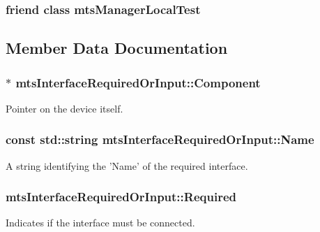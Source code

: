 \hypertarget{classmts_interface_required_or_input_adc2ae8db48d5418c526f275aafa3d4a9}{
\subsubsection[{mts\-Manager\-Local\-Test}]{\setlength{\rightskip}{0pt plus 5cm}friend class mts\-Manager\-Local\-Test\hspace{0.3cm}{\ttfamily [friend]}}}\label{classmts_interface_required_or_input_adc2ae8db48d5418c526f275aafa3d4a9}


\subsection{Member Data Documentation}
\hypertarget{classmts_interface_required_or_input_a671dde64d1580dde3b87a8fc97ac9462}{
\subsubsection[{Component}]{$\ast$ mts\-Interface\-Required\-Or\-Input\-::\-Component\hspace{0.3cm}{\ttfamily [protected]}}}\label{classmts_interface_required_or_input_a671dde64d1580dde3b87a8fc97ac9462}
Pointer on the device itself. \hypertarget{classmts_interface_required_or_input_aeaaf350b344d0b697b19c6f642b67317}{
\subsubsection[{Name}]{\setlength{\rightskip}{0pt plus 5cm}const std\-::string mts\-Interface\-Required\-Or\-Input\-::\-Name\hspace{0.3cm}{\ttfamily [protected]}}}\label{classmts_interface_required_or_input_aeaaf350b344d0b697b19c6f642b67317}
A string identifying the 'Name' of the required interface. \hypertarget{classmts_interface_required_or_input_ac0ae074f8fe197420257c16e1f0f7db2}{
\subsubsection[{Required}]{ mts\-Interface\-Required\-Or\-Input\-::\-Required\hspace{0.3cm}{\ttfamily [protected]}}}\label{classmts_interface_required_or_input_ac0ae074f8fe197420257c16e1f0f7db2}
Indicates if the interface must be connected. 

